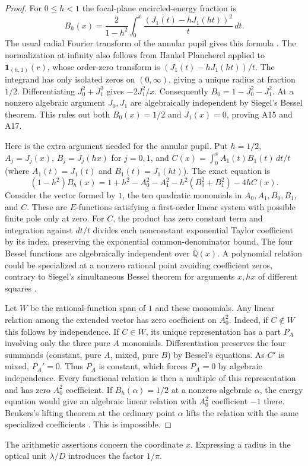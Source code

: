 \documentclass[11pt,a4paper]{article}
\theoremstyle{definition}
\theoremstyle{remark}
\begin{document}
\begin{proof}
For $0\le h<1$ the focal-plane encircled-energy fraction is
\[
 B_h(x)=\frac{2}{1-h^2}\int_0^x
       \frac{(J_1(t)-hJ_1(ht))^2}{t}\,dt .
\]
The usual radial Fourier transform of the annular pupil gives this
formula \cite{aPupil}. The normalization at infinity also follows from Hankel
Plancherel applied to $\mathbf1_{(h,1)}(r)$, whose order-zero transform
is $(J_1(t)-hJ_1(ht))/t$. The integrand has only isolated zeros on
$(0,\infty)$, giving a unique radius at fraction $1/2$. Differentiating
$J_0^2+J_1^2$ gives $-2J_1^2/x$. Consequently
$B_0=1-J_0^2-J_1^2$. At a nonzero algebraic argument $J_0,J_1$
are algebraically independent by Siegel's Bessel theorem. This rules
out both $B_0(x)=1/2$ and $J_1(x)=0$, proving A15 and A17.

Here is the extra argument needed for the annular pupil. Put $h=1/2$,
$A_j=J_j(x)$, $B_j=J_j(hx)$ for $j=0,1$, and
$C(x)=\int_0^x A_1(t)B_1(t)\,dt/t$ (where $A_1(t)=J_1(t)$ and
$B_1(t)=J_1(ht)$). The exact equation is
\[
 (1-h^2)B_h(x)=1+h^2-A_0^2-A_1^2-h^2(B_0^2+B_1^2)-4hC(x).
\]
Consider the vector formed by $1$, the ten quadratic monomials in
$A_0,A_1,B_0,B_1$, and $C$. These are $E$-functions satisfying a
first-order linear system with possible finite pole only at zero.
For $C$, the product has zero constant term and integration against
$dt/t$ divides each nonconstant exponential Taylor coefficient by its
index, preserving the exponential common-denominator bound.
The four Bessel functions are algebraically independent over
$\overline{\mathbb Q}(x)$. A polynomial relation could be specialized
at a nonzero rational point avoiding coefficient zeros, contrary to
Siegel's simultaneous Bessel theorem for arguments $x,hx$ of different
squares \cite[\S4, Theorem 2]{aFeld}.

Let $W$ be the rational-function span of $1$ and these monomials. Any
linear relation among the extended vector has zero coefficient on
$A_0^2$. Indeed, if $C\notin W$ this follows by independence. If
$C\in W$, its unique representation has a part $P_A$ involving only
the three pure $A$ monomials. Differentiation preserves the four
summands (constant, pure $A$, mixed, pure $B$) by Bessel's equations.
As $C'$ is mixed, $P_A'=0$. Thus $P_A$ is constant, which forces
$P_A=0$ by algebraic independence. Every functional relation is then
a multiple of this representation and has zero $A_0^2$ coefficient.
If $B_h(\alpha)=1/2$ at a nonzero algebraic $\alpha$, the energy
equation would give an algebraic linear relation with $A_0^2$
coefficient $-1$ there. Beukers's lifting theorem at the ordinary point
$\alpha$ lifts the relation with the same specialized coefficients
\cite[Theorem 1.3]{aBeu}. This is impossible.
\end{proof}
The arithmetic assertions concern the coordinate $x$. Expressing
a radius in the optical unit $\lambda/D$ introduces the factor $1/\pi$.
\end{document}
